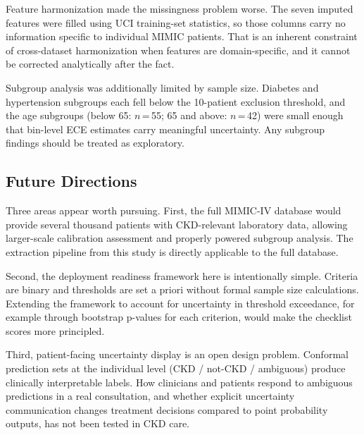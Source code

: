 Feature harmonization made the missingness problem worse. The seven imputed features were filled using UCI training-set statistics, so those columns carry no information specific to individual MIMIC patients. That is an inherent constraint of cross-dataset harmonization when features are domain-specific, and it cannot be corrected analytically after the fact.

Subgroup analysis was additionally limited by sample size. Diabetes and hypertension subgroups each fell below the 10-patient exclusion threshold, and the age subgroups (below 65: $n$\,=\,55; 65 and above: $n$\,=\,42) were small enough that bin-level ECE estimates carry meaningful uncertainty. Any subgroup findings should be treated as exploratory.

\subsection{Future Directions}

Three areas appear worth pursuing. First, the full MIMIC-IV database would provide several thousand patients with CKD-relevant laboratory data, allowing larger-scale calibration assessment and properly powered subgroup analysis. The extraction pipeline from this study is directly applicable to the full database.

Second, the deployment readiness framework here is intentionally simple. Criteria are binary and thresholds are set a priori without formal sample size calculations. Extending the framework to account for uncertainty in threshold exceedance, for example through bootstrap p-values for each criterion, would make the checklist scores more principled.

Third, patient-facing uncertainty display is an open design problem. Conformal prediction sets at the individual level (CKD / not-CKD / ambiguous) produce clinically interpretable labels. How clinicians and patients respond to ambiguous predictions in a real consultation, and whether explicit uncertainty communication changes treatment decisions compared to point probability outputs, has not been tested in CKD care.
